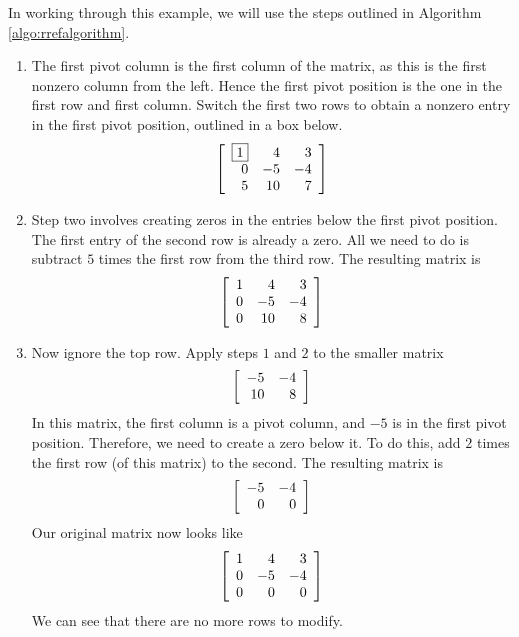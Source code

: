 \begin{solution} In working through this example, we will use the steps outlined in Algorithm \ref{algo:rrefalgorithm}.
\begin{enumerate}

\item The first pivot column is the first column of the matrix, as this is the first nonzero column from the left. 
Hence the first pivot position is the one in the first row and first column. Switch the first two rows to 
obtain a nonzero entry in the first pivot position, outlined in a box below.
\begin{equation*}
\left[
\begin{array}{rrr}
\fbox{1} & 4 & 3 \\
0 & -5 & -4 \\
5 & 10 & 7 
\end{array}
\right]
\end{equation*}

\item Step two involves creating zeros in the entries below the first pivot position. The first entry of the second row
is already a zero. All we need to do is subtract $5$ times the first row from the third row. 
The resulting matrix is 
\begin{equation*}
\left[
\begin{array}{rrr}
1 & 4 & 3 \\
0 & -5 & -4 \\
0 & 10 & 8 
\end{array}
\right]
\end{equation*} 


\item Now ignore the top row.  Apply steps $1$ and $2$ to the smaller matrix
\begin{equation*}
\left[
\begin{array}{rr}
-5 & -4\\
10 & 8 
\end{array}
\right]
\end{equation*}
In this matrix, the first column is a pivot column, and $-5$ is in the first pivot position. Therefore, we need to create a zero below it.
To do this, add $2$ times the first row (of this matrix) to the second. The resulting matrix is
\begin{equation*}
\left[
\begin{array}{rr}
-5 & -4\\
0 & 0
\end{array}
\right]
\end{equation*}
Our original matrix now looks like
\begin{equation*}
\left[
\begin{array}{rrr}
1 & 4 & 3 \\
0 & -5 & -4 \\
0 & 0 & 0 
\end{array}
\right]
\end{equation*}
We can see that there are no more rows to modify.


\end{enumerate}
\end{solution}
